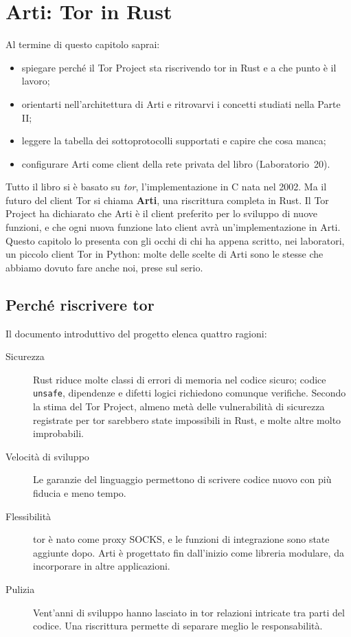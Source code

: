 \chapter{Arti: Tor in Rust}\label{cap:30-arti}

\begin{obiettivi}
Al termine di questo capitolo saprai:
\begin{itemize}[nosep]
  \item spiegare perché il Tor Project sta riscrivendo tor in Rust e a che punto è il lavoro;
  \item orientarti nell'architettura di Arti e ritrovarvi i concetti studiati nella Parte II;
  \item leggere la tabella dei sottoprotocolli supportati e capire che cosa manca;
  \item configurare Arti come client della rete privata del libro (Laboratorio~20).
\end{itemize}
\end{obiettivi}

Tutto il libro si è basato su \emph{tor}, l'implementazione in C nata nel 2002. Ma il futuro del client Tor si chiama \textbf{Arti}, una riscrittura completa in Rust. Il Tor Project ha dichiarato che Arti è il client preferito per lo sviluppo di nuove funzioni, e che ogni nuova funzione lato client avrà un'implementazione in Arti. Questo capitolo lo presenta con gli occhi di chi ha appena scritto, nei laboratori, un piccolo client Tor in Python: molte delle scelte di Arti sono le stesse che abbiamo dovuto fare anche noi, prese sul serio.

\section{Perché riscrivere tor}\label{sec:arti-perche}

Il documento introduttivo del progetto elenca quattro ragioni:
\begin{description}
  \item[Sicurezza] Rust riduce molte classi di errori di memoria nel codice sicuro; codice \texttt{unsafe}, dipendenze e difetti logici richiedono comunque verifiche. Secondo la stima del Tor Project, almeno metà delle vulnerabilità di sicurezza registrate per tor sarebbero state impossibili in Rust, e molte altre molto improbabili.
  \item[Velocità di sviluppo] Le garanzie del linguaggio permettono di scrivere codice nuovo con più fiducia e meno tempo.
  \item[Flessibilità] tor è nato come proxy SOCKS, e le funzioni di integrazione sono state aggiunte dopo. Arti è progettato fin dall'inizio come libreria modulare, da incorporare in altre applicazioni.
  \item[Pulizia] Vent'anni di sviluppo hanno lasciato in tor relazioni intricate tra parti del codice. Una riscrittura permette di separare meglio le responsabilità.
\end{description}

